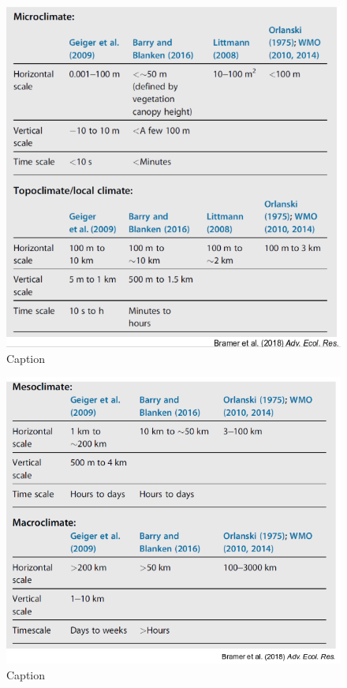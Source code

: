 \documentclass[12pt,oneside]{book}
\begin{document}
\begin{figure}

{\centering \includegraphics[width=0.8\linewidth]{figures/Figure101} 

}

\caption{Caption}\label{fig:Micro1}
\end{figure}

\begin{figure}

{\centering \includegraphics[width=0.8\linewidth]{figures/Figure102} 

}

\caption{Caption}\label{fig:Micro2}
\end{figure}
\end{document}
